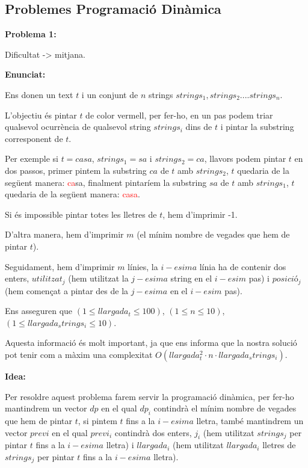 \subsection{Problemes Programació Dinàmica}

\textbf{Problema 1:} \newline

Dificultat -> mitjana. \newline

\textbf{Enunciat:} \newline

Ens donen un text $t$ i un conjunt de $n$ strings $strings_{1},strings_{2}....strings_{n}$.

L'objectiu és pintar $t$ de color vermell, per fer-ho, en un pas podem triar qualsevol ocurrència de qualsevol string $strings_{i}$ dins de $t$ i pintar la substring corresponent de $t$.

Per exemple si $t = casa$, $strings_{1} = sa$ i $strings_{2} = ca$, llavors podem pintar $t$ en dos passos, primer pintem la substring $ca$ de $t$ amb $strings_{2}$, $t$ quedaria de la següent manera: \textcolor{red}{ca}sa, finalment pintaríem la substring $sa$ de $t$ amb $strings_{1}$, $t$ quedaria de la següent manera: \textcolor{red}{casa}.

Si és impossible pintar totes les lletres de $t$, hem d'imprimir -1.

D'altra manera, hem d'imprimir $m$ (el mínim nombre de vegades que hem de pintar $t$).

Seguidament, hem d'imprimir $m$ línies, la $i-esima$ línia ha de contenir dos enters, $utilitzat_{j}$ (hem utilitzat la $j-esima$ string en el $i-esim$ pas) i $posició_{j}$ (hem començat a pintar des de la $j-esima$ en el $i-esim$ pas).
\newline

Ens asseguren que $(1\leq llargada_t \leq 100)$, $(1\leq n \leq 10)$, $(1\leq llargada_strings_{i} \leq 10)$.

Aquesta informació és molt important, ja que ens informa que la nostra solució pot tenir com a màxim una complexitat $O(llargada_t^2 \cdot n \cdot llargada_strings_{i})$. \newline

\textbf{Idea:} \newline

Per resoldre aquest problema farem servir la programació dinàmica, per fer-ho mantindrem un vector $dp$ en el qual $dp_{i}$ contindrà el mínim nombre de vegades que hem de pintar $t$, si pintem $t$ fins a la $i-esima$ lletra, també mantindrem un vector $previ$ en el qual $previ_{i}$ contindrà dos enters, $j_{i}$ (hem utilitzat $strings_{j}$ per pintar $t$ fins a la $i-esima$ lletra) i $llargada_{i}$ (hem utilitzat $llargada_{i}$ lletres de $strings_{j}$ per pintar $t$ fins a la $i-esima$ lletra). \newline

